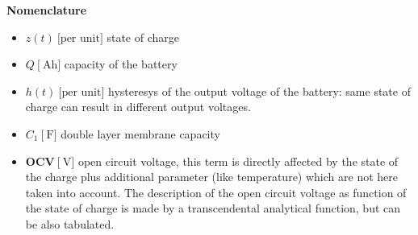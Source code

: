 \documentclass[12pt,a4paper,oneside]{book}
\begin{document}
\begin{onehalfspace}
\vspace{5mm}
\noindent\textbf{Nomenclature}
\begin{itemize}
	\item[--] $z(t)\ \big[\text{per unit}\big]$ state of charge	
	\item[--] $Q\ \big[\SI{}{\ampere\hour}\big]$ capacity of the battery
	\item[--] $h(t)\ \big[\text{per unit}\big]$ hysteresys of the output
	voltage of the battery: same state of charge can result in different output 
	voltages. 
	\item[--] $C_1\ \big[\SI{}{\farad}\big]$ double layer membrane capacity
	\item[--] $\mathbf{OCV}\ \big[\SI{}{\volt}\big]$ open circuit voltage, 
	this term is directly affected by the state of the charge plus additional 
	parameter (like temperature) which are not here taken into account. The 
	description of the open circuit voltage as function of the state of charge 
	is made by a transcendental analytical function, but can be also tabulated.
\end{itemize}


\end{onehalfspace}
\end{document}
